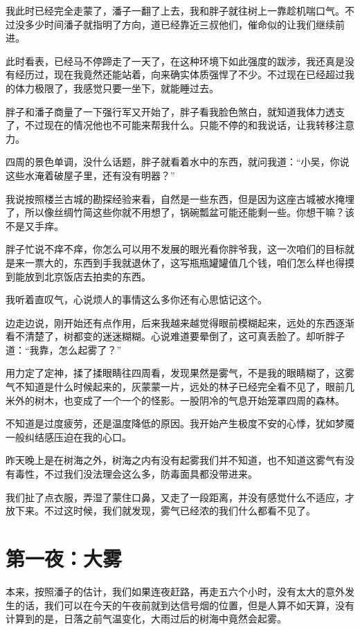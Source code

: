 我此时已经完全走蒙了，潘子一翻了上去，我和胖子就往树上一靠趁机喘口气。不过没多少时间潘子就指明了方向，道已经靠近三叔他们，催命似的让我们继续前进。

此时看表，已经马不停蹄走了一天了，在这种环境下如此强度的跋涉，我还真是没有经历过，现在我竟然还能站着，向来确实体质强悍了不少。不过现在已经超过我的体力极限了，我感觉只要一坐下，就能睡过去。

胖子和潘子商量了一下强行军又开始了，胖子看我脸色煞白，就知道我体力透支了，不过现在的情况他也不可能来帮我什么。只能不停的和我说话，让我转移注意力。

四周的景色单调，没什么话题，胖子就看着水中的东西，就问我道：“小吴，你说这些水淹着破屋子里，还有没有明器？”

我说按照楼兰古城的勘探经验来看，自然是一些东西，但是因为这座古城被水掩埋了，所以像丝绸竹简这些你就不用想了，锅碗瓢盆可能还能剩一些。你想干嘛？该不是又手痒。

胖子忙说不痒不痒，你怎么可以用不发展的眼光看你胖爷我，这一次咱们的目标就是来一票大的，东西到手我就退休了，这写瓶瓶罐罐值几个钱，咱们怎么样也得摸到能放到北京饭店去拍卖的东西。

我听着直叹气，心说烦人的事情这么多你还有心思惦记这个。

边走边说，刚开始还有点作用，后来我越来越觉得眼前模糊起来，远处的东西逐渐看不清楚了，树都变的迷迷糊糊。心说难道要晕倒了，这可真丢脸了。却听胖子道：“我靠，怎么起雾了？”

用力定了定神，揉了揉眼睛往四周看，发现果然是雾气，不是我的眼睛糊了，这雾气不知道是什么时候起来的，灰蒙蒙一片，远处的林子已经完全看不见了，眼前几米外的树木，也变成了一个一个的怪影。一股阴冷的气息开始笼罩四周的森林。

不知道是过度疲劳，还是温度降低的原因。我开始产生极度不安的心悸，犹如梦魇一般纠结感压迫在我的心口。

昨天晚上是在树海之外，树海之内有没有起雾我们并不知道，也不知道这雾气有没有毒性，不过我们没法理会这么多，防毒面具都没带进来。

我们扯了点衣服，弄湿了蒙住口鼻，又走了一段距离，并没有感觉什么不适应，才放下来。不过这时候，我们就发现，雾气已经浓的我们什么都看不见了。

\chapter{第一夜：大雾}

本来，按照潘子的估计，我们如果连夜赶路，再走五六个小时，没有太大的意外发生的话，我们可以在今天的午夜前就到达信号烟的位置，但是人算不如天算，没有计算到的是，日落之前气温变化，大雨过后的树海中竟然会起雾。

